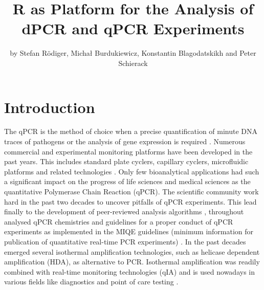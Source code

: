 \title{R as Platform for the Analysis of dPCR and qPCR Experiments}
\author{by Stefan R\"{o}diger, Micha\l{} Burdukiewicz, Konstantin 
Blagodatskikh and Peter Schierack}

\maketitle


\section{Introduction}

The qPCR is the method of choice when a precise quantification of minute DNA 
traces of pathogens or the analysis of gene expression is required 
\citep{peirson_2003}. Numerous commercial and experimental monitoring platforms 
have been developed in the past years. This includes standard plate cyclers, 
capillary cyclers, microfluidic platforms and related technologies 
\citep{rodiger_highly_2013, devonshire_2013, viturro_2014, 
rodiger_nucleic_2014, 
khodakov_2014}. Only few bioanalytical applications had such a significant 
impact on the progress of life sciences and medical sciences as the 
quantitative 
Polymerase Chain Reaction (qPCR). The scientific community work hard in the 
past 
two decades to uncover pitfalls of qPCR experiments. This lead finally to the 
development of peer-reviewed analysis algorithms \citep{ruijter_2013}, 
throughout analysed qPCR chemistries \citep{ruijter_2014} and guidelines for a 
proper conduct of qPCR experiments as implemented in the MIQE guidelines 
(minimum information for publication of quantitative real-time PCR experiments) 
\citep{bustin_miqe_2009, huggett_2013}. In the past decades 
emerged several isothermal amplification technologies, such as helicase 
dependent amplification (HDA), as alternative to PCR. Isothermal amplification 
was readily combined with real-time monitoring technologies (qIA) and is used 
nowadays in various fields like diagnostics and point of care testing 
\citep{rodiger_nucleic_2014}.

